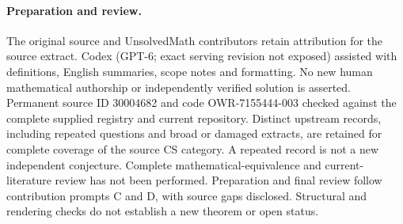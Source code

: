 \documentclass[11pt]{article}
\begin{document}
\paragraph{Preparation and review.}
The original source and UnsolvedMath contributors retain attribution for the source extract. Codex (GPT-6; exact serving revision not exposed) assisted with definitions, English summaries, scope notes and formatting. No new human mathematical authorship or independently verified solution is asserted. Permanent source ID 30004682 and code OWR-7155444-003 checked against the complete supplied registry and current repository. Distinct upstream records, including repeated questions and broad or damaged extracts, are retained for complete coverage of the source CS category. A repeated record is not a new independent conjecture. Complete mathematical-equivalence and current-literature review has not been performed. Preparation and final review follow contribution prompts C and D, with source gaps disclosed. Structural and rendering checks do not establish a new theorem or open status.
\label{end:30004682}
\end{document}

